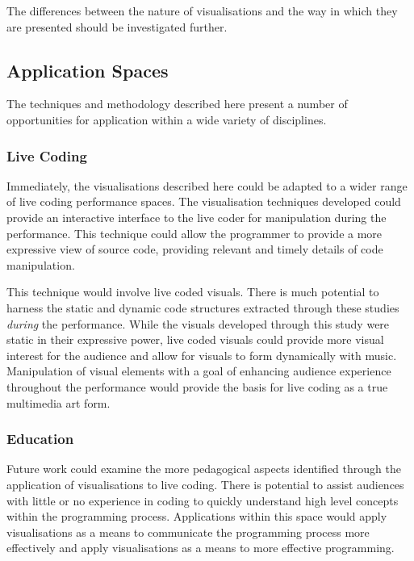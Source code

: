 The differences between the nature of visualisations and the way in which they are presented should be investigated further. \more

\subsection{Application Spaces}

The techniques and methodology described here present a number of opportunities for application within a wide variety of disciplines.

\subsubsection{Live Coding}

Immediately, the visualisations described here could be adapted to a wider range of live coding performance spaces. The visualisation techniques developed could provide an interactive interface to the live coder for manipulation during the performance. This technique could allow the programmer to provide a more expressive view of source code, providing relevant and timely details of code manipulation.

This technique would involve live coded visuals. There is much potential to harness the static and dynamic code structures extracted through these studies \emph{during} the performance. While the visuals developed through this study were static in their expressive power, live coded visuals could provide more visual interest for the audience and allow for visuals to form dynamically with music. Manipulation of visual elements with a goal of enhancing audience experience throughout the performance would provide the basis for live coding as a true multimedia art form.

\subsubsection{Education}

Future work could examine the more pedagogical aspects identified through the application of visualisations to live coding. There is potential to assist audiences with little or no experience in coding to quickly understand high level concepts within the programming process. Applications within this space would apply visualisations as a means to communicate the programming process more effectively and apply visualisations as a means to more effective programming.

